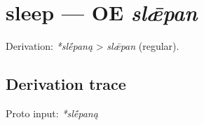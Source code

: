 \documentclass[
  british,
  a4paper,
  openany]{book}
\providecommand{\texorpdfstring}[2]{#1}
\begin{document}
\section{\texorpdfstring{sleep --- OE
\emph{slǣpan}}{sleep --- OE slǣpan}}\label{sleep-oe-slux1e3pan}


Derivation: \emph{*slḗpaną} \textgreater{} \emph{slǣpan} (regular).

\subsection{Derivation trace}\label{derivation-trace-46}

Proto input: \emph{*slḗpaną}

\begingroup
\setlength{\fboxsep}{6pt}
\end{document}
